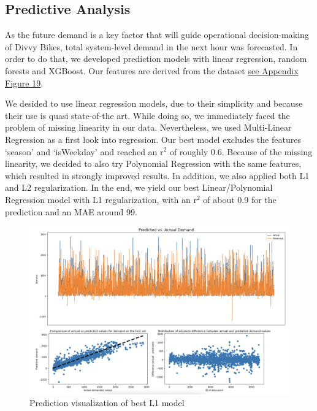 \subsection{Predictive Analysis}
\label{subsec:prediction}

As the future demand is a key factor that will guide operational decision-making of Divvy Bikes, total system-level demand in the next hour was forecasted. In order to do that, we developed prediction models with linear regression, random forests and XGBoost. Our features are derived from the dataset \hyperref[Pred_Fig_1]{see Appendix Figure 19}.

We desided to use linear regression models, due to their simplicity and because their use is quasi state-of-the art. While doing so, we immediately faced the problem of missing linearity in our data. Nevertheless, we used Multi-Linear Regression as a first look into regression. Our best model excludes the features ‘season’ and ‘isWeekday’ and reached an r$^{2}$ of roughly 0.6. Because of the missing linearity, we decided to also try Polynomial Regression with the same features, which resulted in strongly improved results. In addition, we also applied both L1 and L2 regularization. In the end, we yield our best Linear/Polynomial Regression model with L1 regularization, with an r$^{2}$ of about 0.9 for the prediction and an MAE around 99.

\begin{figure}[H]
   \centering
    \includegraphics[width=1\linewidth]{./Figures/l1_final.png}
    \caption{Prediction visualization of best L1 model}
    \label{l1}
\end{figure}


